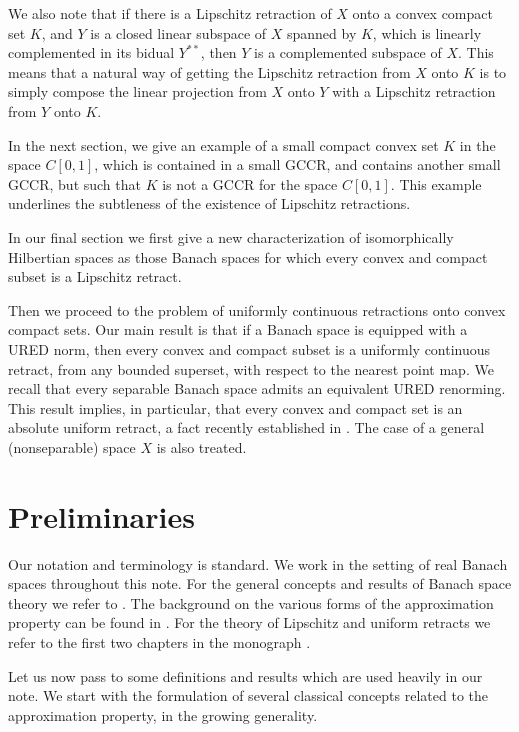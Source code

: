 \documentclass[11pt]{amsart}
\newcommand{\<}{\langle}
\renewcommand{\>}{\rangle}
\theoremstyle{definition}
\theoremstyle{remark}
\numberwithin{equation}{section}
\begin{document}
We also note that
if there is a Lipschitz retraction of $X$ onto a convex compact set $K$, and $Y$ is a closed linear subspace of $X$
spanned by $K$, which is linearly complemented in its bidual $Y^{**}$, then $Y$ is a complemented subspace of $X$.
This means that a natural way of getting the Lipschitz retraction from $X$ onto $K$ is  to simply 
compose the linear projection from $X$ onto $Y$ with a Lipschitz retraction from $Y$ onto $K$.

In the next section, we give an example of a small  compact convex set $K$ in the space $C[0,1]$, which is contained in a small GCCR,
 and contains another small GCCR, but such that $K$ is not a 
GCCR for the space $C[0,1]$. This example underlines the subtleness of the existence of Lipschitz retractions.


In our final section we first give a new characterization of isomorphically Hilbertian spaces as those Banach spaces for which every convex and compact subset
is a Lipschitz retract. 

Then we
 proceed to the problem of uniformly continuous retractions onto convex compact sets.
Our main result is that if a  Banach space is equipped with a URED norm, then
every convex  and compact subset is a uniformly continuous retract, from any bounded superset, with respect to the nearest point map.
We recall that every separable Banach space admits an equivalent URED renorming.
This result implies, in particular, that every convex and compact set is an absolute uniform retract,
a fact recently established in \cite{CCW21}. The case of a general (nonseparable) space $X$ is also treated.




\section{Preliminaries}

Our notation and terminology is standard. We work in the setting of real Banach spaces throughout this note.
For the general concepts and results of Banach space theory we refer to \cite{Fab1}.
The background on the various forms of the approximation property can be found in \cite{Cas01}.
For  the theory of Lipschitz and uniform retracts we refer to the first
two chapters in the monograph \cite{BL2000}.

Let us now pass to some definitions and results which are used heavily in our note. We start with the formulation of  several classical
concepts related to the approximation property, in the growing generality.
\end{document}
